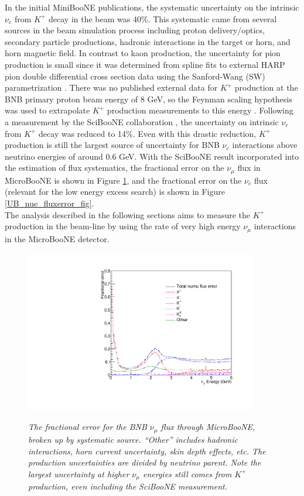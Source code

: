 In the initial MiniBooNE publications, the systematic uncertainty on the intrinsic $\nu_e$ from $K^+$ decay in the beam was 40\%. This systematic came from several sources in the beam simulation process including proton delivery/optics, secondary particle productions, hadronic interactions in the target or horn, and horn magnetic field. In contrast to kaon production, the uncertainty for pion production is small since it was determined from spline fits to external HARP pion double differential cross section data using the Sanford-Wang (SW) parametrization \cite{SanfordWangGary7} \cite{HARPgary8}. There was no published external data for $K^+$ production at the BNB primary proton beam energy of 8 GeV, so the Feynman scaling hypothesis was used to extrapolate $K^+$ production measurements to this energy \cite{FEYNMANgary6}. Following a measurement by the SciBooNE collaboration \cite{gary_kaon_production_paper}, the uncertainty on intrinsic $\nu_e$ from $K^+$ decay  was reduced to 14\%. Even with this drastic reduction, $K^+$ production is still the largest source of uncertainty for BNB $\nu_e$ interactions above neutrino energies of around 0.6 GeV. With the SciBooNE result incorporated into the estimation of flux systematics, the fractional error on the $\nu_\mu$ flux in MicroBooNE is shown in Figure \ref{UB_numu_fluxerror_fig}, and the fractional error on the $\nu_e$ flux (relevant for the low energy excess search) is shown in Figure \ref{UB_nue_fluxerror_fig}.\\

The analysis described in the following sections aims to measure the $K^+$ production in the beam-line by using the rate of very high energy $\nu_\mu$ interactions in the MicroBooNE detector.

\begin{figure}[ht!]
\centering
	\includegraphics[width=0.9\textwidth]{Figures/UB_numu_fluxerr.pdf} \\
\caption{\textit{The fractional error for the BNB $\nu_\mu$ flux through MicroBooNE, broken up by systematic source. ``Other'' includes hadronic interactions, horn current uncertainty, skin depth effects, etc. The production uncertainties are divided by neutrino parent. Note the largest uncertainty at higher $\nu_\mu$ energies still comes from $K^+$ production, even including the SciBooNE measurement.}}\label{UB_numu_fluxerror_fig}
\end{figure}

